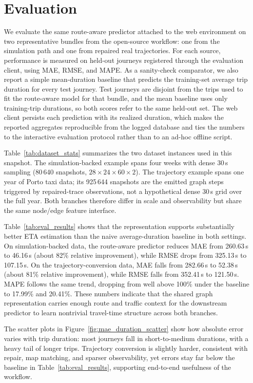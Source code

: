 \section{Evaluation}\label{sec:eval}

We evaluate the same route-aware predictor attached to the web environment on two representative bundles from the open-source workflow: one from the simulation path and one from repaired real trajectories. For each source, performance is measured on held-out journeys registered through the evaluation client, using MAE, RMSE, and MAPE. As a sanity-check comparator, we also report a simple mean-duration baseline that predicts the training-set average trip duration for every test journey.
Test journeys are disjoint from the trips used to fit the route-aware model for that bundle, and the mean baseline uses only training-trip durations, so both scores refer to the same held-out set.
The web client persists each prediction with its realized duration, which makes the reported aggregates reproducible from the logged database and ties the numbers to the interactive evaluation protocol rather than to an ad-hoc offline script.

Table~\ref{tab:dataset_stats} summarizes the two dataset instances used in this snapshot. The simulation-backed example spans four weeks with dense 30\,s sampling (80\,640 snapshots, $28 \times 24 \times 60 \times 2$). The trajectory example spans one year of Porto taxi data; its 925\,644 snapshots are the emitted graph steps triggered by repaired-trace observations, not a hypothetical dense 30\,s grid over the full year. Both branches therefore differ in scale and observability but share the same node/edge feature interface.



Table~\ref{tab:eval_results} shows that the representation supports substantially better ETA estimation than the naive average-duration baseline in both settings. On simulation-backed data, the route-aware predictor reduces MAE from 260.63\,s to 46.16\,s (about 82\% relative improvement), while RMSE drops from 325.13\,s to 107.15\,s. On the trajectory-conversion data, MAE falls from 282.66\,s to 52.38\,s (about 81\% relative improvement), while RMSE falls from 352.41\,s to 121.50\,s. MAPE follows the same trend, dropping from well above 100\% under the baseline to 17.99\% and 20.41\%. These numbers indicate that the shared graph representation carries enough route and traffic context for the downstream predictor to learn nontrivial travel-time structure across both branches.

The scatter plots in Figure~\ref{fig:mae_duration_scatter} show how absolute error varies with trip duration: most journeys fall in short-to-medium durations, with a heavy tail of longer trips. Trajectory conversion is slightly harder, consistent with repair, map matching, and sparser observability, yet errors stay far below the baseline in Table~\ref{tab:eval_results}, supporting end-to-end usefulness of the workflow.


